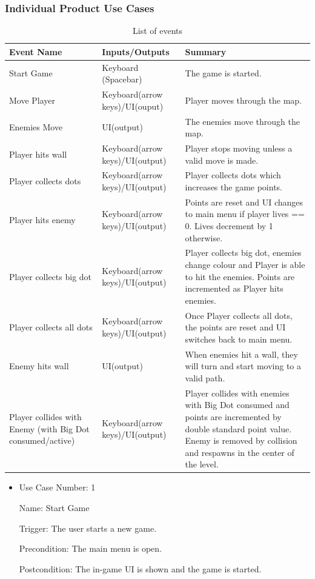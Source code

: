 \documentclass[12pt, titlepage]{article}
\begin{document}
\subsubsection{Individual Product Use Cases}

\begin{table}[H]
\caption{List of events} \label{tab:events}
\begin{tabularx}{\textwidth}{| p{3cm} | p{4cm} | X |}
\toprule {\bf Event Name} & {\bf Inputs/Outputs} & {\bf Summary}\\
\midrule
Start Game & Keyboard (Spacebar) & The game is started.\\ \hline
Move Player & Keyboard(arrow keys)/UI(ouput) & Player moves through the map.\\ \hline
Enemies Move & UI(output) & The enemies move through the map.\\ \hline
Player hits wall & Keyboard(arrow keys)/UI(output) & Player stops moving unless a valid move is made.\\ \hline
Player collects dots & Keyboard(arrow keys)/UI(output) & Player collects dots which increases the game points.\\ \hline
Player hits enemy & Keyboard(arrow keys)/UI(output) & Points are reset and UI changes to main menu if player lives == 0. Lives decrement by 1 otherwise.\\ \hline
Player collects big dot & Keyboard(arrow keys)/UI(output) & Player collects big dot, enemies change colour and Player is able to hit the enemies. Points are incremented as Player hits enemies.\\ \hline
Player collects all dots & Keyboard(arrow keys)/UI(output) & Once Player collects all dots, the points are reset and UI switches back to main menu.\\ \hline
Enemy hits wall & UI(output) & When enemies hit a wall, they will turn and start moving to a valid path.\\ \hline
Player collides with Enemy (with Big Dot consumed/active) & Keyboard(arrow keys)/UI(output) & Player collides with enemies with Big Dot consumed and points are incremented by double standard point value. Enemy is removed by collision and respawns in the center of the level.\\
\bottomrule
\end{tabularx}
\end{table}
\begin{itemize}
\item
Use Case Number: 1

Name: Start Game

Trigger: The user starts a new game.

Precondition: The main menu is open.

Postcondition: The in-game UI is shown and the game is started.

\end{itemize}
\end{document}
